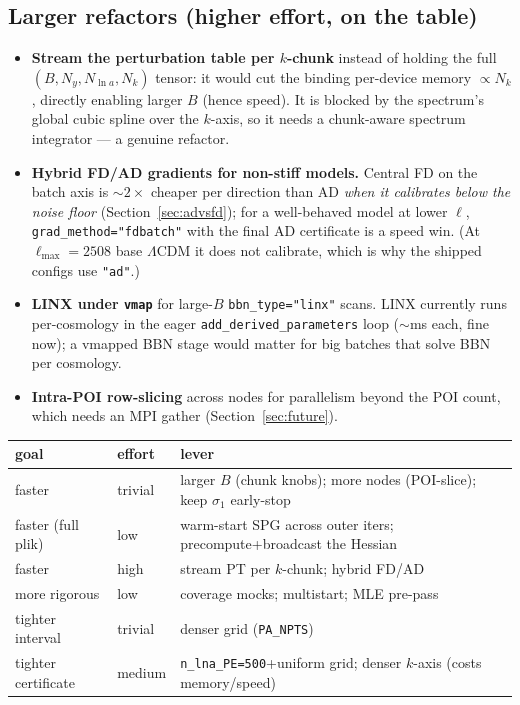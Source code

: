 \documentclass[11pt]{article}
\newcommand{\code}[1]{\texttt{\small #1}}
\newcommand{\Lmax}{\ell_{\max}}
\begin{document}
\subsection{Larger refactors (higher effort, on the table)}
\begin{itemize}[leftmargin=1.5em,itemsep=1pt]
\item \textbf{Stream the perturbation table per $k$-chunk}
instead of holding the full $(B,N_y,N_{\ln a},N_k)$ tensor: it would cut
the binding per-device memory $\propto N_k$, directly enabling larger $B$
(hence speed). It is blocked by the spectrum's global cubic spline over the
$k$-axis, so it needs a chunk-aware spectrum integrator --- a genuine
refactor.
\item \textbf{Hybrid FD/AD gradients for non-stiff models.} Central FD on
the batch axis is $\sim2\times$ cheaper per direction than AD \emph{when it
calibrates below the noise floor} (Section~\ref{sec:advsfd}); for a
well-behaved model at lower $\ell$, \code{grad\_method="fdbatch"} with the
final AD certificate is a speed win. (At $\Lmax=2508$ base $\Lambda$CDM it
does not calibrate, which is why the shipped configs use \code{"ad"}.)
\item \textbf{LINX under \code{vmap}} for large-$B$ \code{bbn\_type="linx"}
scans. LINX currently runs per-cosmology in the eager
\code{add\_derived\_parameters} loop ($\sim$ms each, fine now); a vmapped
BBN stage would matter for big batches that solve BBN per cosmology.
\item \textbf{Intra-POI row-slicing} across nodes for parallelism beyond
the POI count, which needs an MPI gather (Section~\ref{sec:future}).
\end{itemize}

\begin{center}
\begin{tabular}{p{}p{}p{}}
\toprule
goal & effort & lever \\
\midrule
faster & trivial & larger $B$ (chunk knobs); more nodes (POI-slice); keep $\sigma_1$ early-stop \\
faster (full plik) & low & warm-start SPG across outer iters; precompute+broadcast the Hessian \\
faster & high & stream PT per $k$-chunk; hybrid FD/AD \\
more rigorous & low & coverage mocks; multistart; MLE pre-pass \\
tighter interval & trivial & denser grid (\code{PA\_NPTS}) \\
tighter certificate & medium & \code{n\_lna\_PE=500}+uniform grid; denser $k$-axis (costs memory/speed) \\
\bottomrule
\end{tabular}
\end{center}
\end{document}
